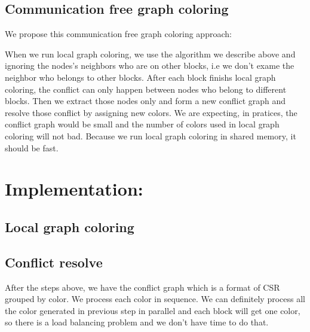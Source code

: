 \documentclass[12pt] {article}
\begin{document}
\subsection{Communication free graph coloring}
We propose this communication free graph coloring approach:
\begin{figure}[!tbh]
\centering        
   \caption{ }
   \label{fig:fig2}
\end{figure} 

When we run local graph coloring, we use the algorithm we describe above and ignoring the nodes's neighbors who are on other blocks, i.e we don't exame the neighbor who belongs to other blocks. After each block finishs local graph coloring, the conflict can only happen between nodes who belong to different blocks. Then we extract those nodes only and form a new conflict graph and resolve those conflict by assigning new colors. We are expecting, in pratices, the conflict graph would be small and the number of colors used in local graph coloring will not bad. Because we run local graph coloring in shared memory, it should be fast. 

\section{Implementation:}

\subsection{Local graph coloring}

\subsection{Conflict resolve}
After the steps above, we have the conflict graph which is a format of CSR grouped by color. We process each color in sequence. We can definitely process all the color generated in previous step in parallel and each block will get one color, so there is a load balancing problem and we don't have time to do that. 
\end{document}
